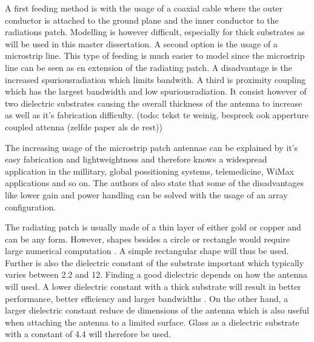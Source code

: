 A first feeding method is with the usage of a coaxial cable where the outer conductor is attached to the ground plane and the inner conductor to the radiations patch. Modelling is however difficult, especially for thick substrates as will be used in this master dissertation.
A second option is the usage of a microstrip line. This type of feeding is much easier to model since the microstrip line can be seen as en extension of the radiating patch.
A disadvantage is the increased \gls{spuriousradiation} which limits bandwith.
A third is proximity coupling which has the largest bandwidth and low \gls{spuriousradiation}. It consist however of two dielectric substrates causing the overall thickness
of the antenna to increase as well as it's fabrication difficulty.
(todo: tekst te weinig, bespreek ook apperture coupled attenna (zelfde paper als de rest))

The increasing usage of the microstrip patch antennae can be explained by it's easy fabrication and lightweightness and therefore knows a widespread application in the millitary, global possitioning systems, telemedicine, WiMax applications and so on.
The authors of \cite{J13_microstripadvantages} also state that some of the disadvantages like lower gain and power handling can be solved with the usage of an array configuration.

The radiating patch is usually made of a thin layer of either gold or copper \cite{J14_antennadesign,J15_antennadesign}
and can be any form. However, shapes besides a circle or rectangle would require large numerical computation \cite{J14_antennadesign}.
A simple rectangular shape will thus be used.
Further is also the dielectric constant of the substrate important which typically varies between 2.2 and 12. Finding a good dielectric depends on how the antenna will used. A lower
dielectric constant with a thick substrate will result in better performance, better efficiency and larger bandwidths  \cite{J15_antennadesign}.
On the other hand, a larger dielectric constant reduce de dimensions of the antenna \cite{J14_antennadesign}
which is also useful when attaching the 
antenna to a limited surface. Glass as a dielectric substrate with a constant of 4.4 will therefore be used.